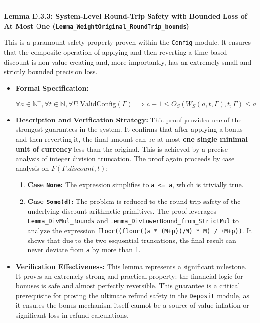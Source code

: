 \documentclass[
  english,
  onecolumn]{article}
\providecommand{\tightlist}{%
  \setlength{\itemsep}{0pt}\setlength{\parskip}{0pt}}
\begin{document}
\begin{center}\rule{0.5\linewidth}{0.5pt}\end{center}

\textbf{Lemma D.3.3: System-Level Round-Trip Safety with Bounded Loss of
At Most One (\texttt{Lemma\_WeightOriginal\_RoundTrip\_bounds}) }

This is a paramount safety property proven within the \texttt{Config}
module. It ensures that the composite operation of applying and then
reverting a time-based discount is non-value-creating and, more
importantly, has an extremely small and strictly bounded precision loss.

\begin{itemize}
\item
  \textbf{Formal Specification:}

  \(\forall a \in \mathbb{N}^+, \forall t \in \mathbb{N}, \forall \Gamma : \text{ValidConfig}(\Gamma) \implies a - 1 \le O_S(W_S(a, t, \Gamma), t, \Gamma) \le a\)
\item
  \textbf{Description and Verification Strategy:} This proof provides
  one of the strongest guarantees in the system. It confirms that after
  applying a bonus and then reverting it, the final amount can be at
  most \textbf{one single minimal unit of currency} less than the
  original. This is achieved by a precise analysis of integer division
  truncation. The proof again proceeds by case analysis on
  \(F(\Gamma.discount, t)\):

  \begin{enumerate}
  \def\labelenumi{\arabic{enumi}.}
  \tightlist
  \item
    \textbf{Case \texttt{None}:} The expression simplifies to
    \texttt{a\ \textless{}=\ a}, which is trivially true.
  \item
    \textbf{Case \texttt{Some(d)}:} The problem is reduced to the
    round-trip safety of the underlying discount arithmetic primitives.
    The proof leverages \texttt{Lemma\_DivMul\_Bounds} and
    \texttt{Lemma\_DivLowerBound\_from\_StrictMul} to analyze the
    expression \texttt{floor((floor((a\ *\ (M+p))/M)\ *\ M)\ /\ (M+p))}.
    It shows that due to the two sequential truncations, the final
    result can never deviate from \texttt{a} by more than 1.
  \end{enumerate}
\item
  \textbf{Verification Effectiveness:} This lemma represents a
  significant milestone. It proves an extremely strong and practical
  property: the financial logic for bonuses is safe and almost perfectly
  reversible. This guarantee is a critical prerequisite for proving the
  ultimate refund safety in the \texttt{Deposit} module, as it ensures
  the bonus mechanism itself cannot be a source of value inflation or
  significant loss in refund calculations.
\end{itemize}
\end{document}
